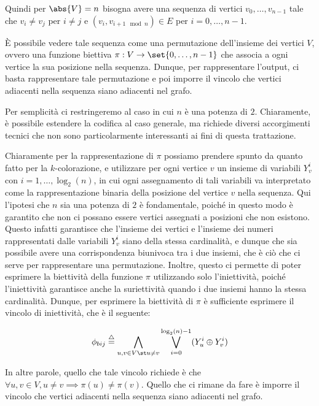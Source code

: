 Quindi per \(\abs{V}=n\) bisogna avere una sequenza di vertici \(v_0, \ldots, v_{n-1}\) tale che \(v_i \neq v_j\) per \(i\neq j\) e \((v_i,v_{i+1 \mod n})\in E\) per \(i=0,\ldots, n-1\).

È possibile vedere tale sequenza come una permutazione dell'insieme dei vertici \(V\), ovvero una funzione biettiva \(\pi:V\to \set{0,\ldots,n-1}\) che associa a ogni vertice la sua posizione nella sequenza. Dunque, per rappresentare l'output, ci basta rappresentare tale permutazione e poi imporre il vincolo che vertici adiacenti nella sequenza siano adiacenti nel grafo.

Per semplicità ci restringeremo al caso in cui \(n\) è una potenza di \(2\). Chiaramente, è possibile estendere la codifica al caso generale, ma richiede diversi accorgimenti tecnici che non sono particolarmente interessanti ai fini di questa trattazione.

Chiaramente per la rappresentazione di \(\pi\) possiamo prendere spunto da quanto fatto per la \(k\)-colorazione, e utilizzare per ogni vertice \(v\) un insieme di variabili \(Y_v^i\) con \(i=1,\dots,\log_2(n)\), in cui ogni assegnamento di tali variabili va interpretato come la rappresentazione binaria della posizione del vertice \(v\) nella sequenza. Qui l'ipotesi che \(n\) sia una potenza di \(2\) è fondamentale, poiché in questo modo è garantito che non ci possano essere vertici assegnati a posizioni che non esistono. Questo infatti garantisce che l'insieme dei vertici e l'insieme dei numeri rappresentati dalle variabili \(Y_v^i\) siano della stessa cardinalità, e dunque che sia possibile avere una corrispondenza biunivoca tra i due insiemi, che è ciò che ci serve per rappresentare una permutazione. Inoltre, questo ci permette di poter esprimere la biettività della funzione \(\pi\) utilizzando solo l'iniettività, poiché l'iniettività garantisce anche la suriettività quando i due insiemi hanno la stessa cardinalità. Dunque, per esprimere la biettività di \(\pi\) è sufficiente esprimere il vincolo di iniettività, che è il seguente:

\[\phi_{bij} \eqdef \bigwedge_{u,v\in V\st u\neq v} \bigvee_{i=0}^{\log_2(n)-1} (Y_u^i \oplus Y_v^i)\]

In altre parole, quello che tale vincolo richiede è che \(\forall u,v \in V, u\neq v \implies \pi(u)\neq\pi(v)\).
Quello che ci rimane da fare è imporre il vincolo che vertici adiacenti nella sequenza siano adiacenti nel grafo.

